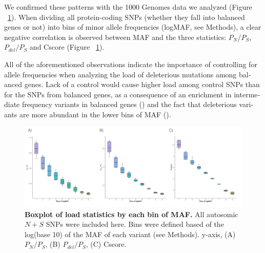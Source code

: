 \begin{refsection}
\begin{otherlanguage}{english}
We confirmed these patterns with the 1000 Genomes data we analyzed (Figure ~\ref{fig:logMAF_bins_2}). When dividing all protein-coding  SNPs (whether they fall into balanced genes or not) into bins of minor allele frequencies (logMAF, see Methods), a clear negative correlation is observed between MAF and the three statistics: $P_{N}/P_{S}$, $P_{del}/P_{S}$ and Cscore (Figure ~\ref{fig:logMAF_bins_2}).

All of the aforementioned observations indicate the importance of controlling for allele frequencies when analyzing the load of deleterious mutations among balanced genes. Lack of a control would cause higher load among control SNPs than for the SNPs from balanced genes, as a consequence of an enrichment in intermediate frequency variants in balanced genes (\cite{Bitarello2016}) and the fact that deleterious variants are more abundant in the lower bins of MAF (\cite{Adzhubei2010,Kircher2014,Lohmueller2008,Subramanian2016}).


\newpage
\begin{figure}
\includegraphics[]{chap3_folder/figures/logMAF_bins_2.png}
\caption{\textbf{Boxplot of load statistics by each bin of MAF.}
All autosomic $N+S$ SNPs were included here. Bins were defined based of the log(base 10) of the MAF of each variant (see Methods).
y-axis, (A) $P_{N}/P_{S}$, (B) $P_{del}/P_{S}$, (C) Cscore.
}
\label{fig:logMAF_bins_2}
\end{figure}





\end{otherlanguage}
\end{refsection}
